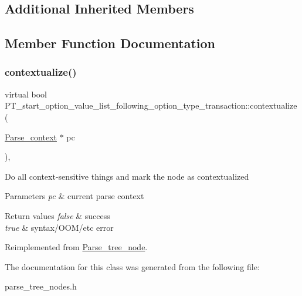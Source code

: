 \subsection*{Additional Inherited Members}


\subsection{Member Function Documentation}
\mbox{\label{classPT__start__option__value__list__following__option__type__transaction_ac15edbbf907d20a95c589a0e1e016e2a}} 
\subsubsection{\texorpdfstring{contextualize()}{contextualize()}}
{\footnotesize\ttfamily virtual bool P\+T\+\_\+start\+\_\+option\+\_\+value\+\_\+list\+\_\+following\+\_\+option\+\_\+type\+\_\+transaction\+::contextualize (\begin{DoxyParamCaption}\item[{\mbox{\hyperlink{structParse__context}{Parse\+\_\+context}} $\ast$}]{pc }\end{DoxyParamCaption})\hspace{0.3cm}{\ttfamily [inline]}, {\ttfamily [virtual]}}

Do all context-\/sensitive things and mark the node as contextualized


\begin{DoxyParams}{Parameters}
{\em pc} & current parse context\\
\hline
\end{DoxyParams}

\begin{DoxyRetVals}{Return values}
{\em false} & success \\
\hline
{\em true} & syntax/\+O\+O\+M/etc error \\
\hline
\end{DoxyRetVals}


Reimplemented from \mbox{\hyperlink{classParse__tree__node_a22d93524a537d0df652d7efa144f23da}{Parse\+\_\+tree\+\_\+node}}.



The documentation for this class was generated from the following file\+:\begin{DoxyCompactItemize}
\item 
parse\+\_\+tree\+\_\+nodes.\+h\end{DoxyCompactItemize}

